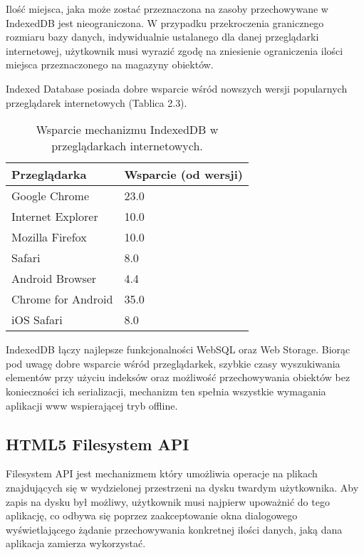 Ilość miejsca, jaka może zostać przeznaczona na zasoby przechowywane w IndexedDB jest nieograniczona. W przypadku przekroczenia granicznego rozmiaru bazy danych, indywidualnie ustalanego dla danej przeglądarki internetowej, użytkownik musi wyrazić zgodę na zniesienie ograniczenia ilości miejsca przeznaczonego na magazyny obiektów.

Indexed Database posiada dobre wsparcie wśród nowszych wersji popularnych przeglądarek internetowych (Tablica 2.3).

\begin{table}[h]
\centering
    \begin{tabular}{ | p{8cm} | p{6cm} | }
    \hline
    \textbf{Przeglądarka} & \textbf{Wsparcie (od wersji)} \\ \hline
	Google Chrome & 23.0
	\\ \hline
	Internet Explorer & 10.0
	\\ \hline
	Mozilla Firefox & 10.0
	\\ \hline
	Safari & 8.0
	\\ \hline
	Android Browser & 4.4
	\\ \hline
	Chrome for Android & 35.0
	\\ \hline
	iOS Safari & 8.0
	\\ \hline
    \end{tabular}
	\caption{Wsparcie mechanizmu IndexedDB w przeglądarkach internetowych.}
\end{table}

IndexedDB łączy najlepsze funkcjonalności WebSQL oraz Web Storage. Biorąc pod uwagę dobre wsparcie wśród przeglądarkek, szybkie czasy wyszukiwania elementów przy użyciu indeksów oraz możliwość przechowywania obiektów bez konieczności ich serializacji, mechanizm ten spełnia wszystkie wymagania aplikacji www wspierającej tryb offline.

\subsection{HTML5 Filesystem API}
\label{sec:html5filesystemApi}

Filesystem API\cite{filesystemApi} jest mechanizmem który umożliwia operacje na plikach znajdujących się w wydzielonej przestrzeni na dysku twardym użytkownika. Aby zapis na dysku był możliwy, użytkownik musi najpierw upoważnić do tego aplikację, co odbywa się poprzez zaakceptowanie okna dialogowego wyświetlającego żądanie przechowywania konkretnej ilości danych, jaką dana aplikacja zamierza wykorzystać.

